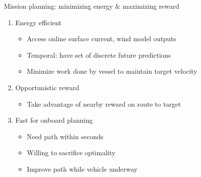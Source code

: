 \documentclass[9pt,xcolor=table]{beamer}
\begin{document}
\begin{frame}{Mission planning: minimizing energy \& maximizing reward}
    \begin{enumerate}
        \item Energy efficient
        \begin{itemize}
            \item Access online surface current, wind model outputs
            \item Temporal: have set of discrete future predictions
            \item Minimize work done by vessel to maintain target velocity
        \end{itemize}
        \item Opportunistic reward
        \begin{itemize}
            \item Take advantage of nearby reward on route to target
        \end{itemize}
        \item Fast for onboard planning
        \begin{itemize}
            \item Need path within seconds
            \item Willing to sacrifice optimality
            \item Improve path while vehicle underway
        \end{itemize}
    \end{enumerate}
    

\end{frame}
\end{document}

